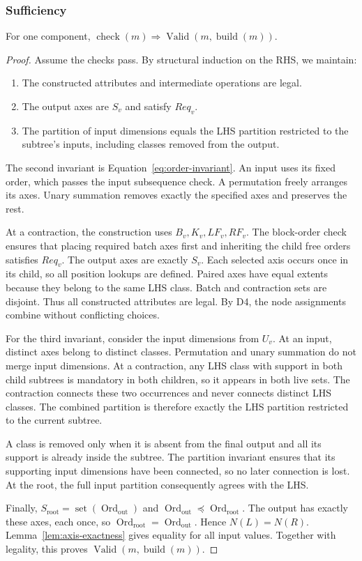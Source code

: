 \subsubsection{Sufficiency}
\begin{lemma}[Sufficiency]
\label{lem:sufficiency}
For one component,
$\operatorname{check}(m)\Rightarrow
\operatorname{Valid}(m,\operatorname{build}(m))$.
\end{lemma}
\begin{proof}
Assume the checks pass. By structural induction on the RHS, we maintain:
\begin{enumerate}
\item The constructed attributes and intermediate operations are legal.
\item The output axes are $S_v$ and satisfy $Req_v$.
\item The partition of input dimensions equals the LHS partition restricted to
the subtree's inputs, including classes removed from the output.
\end{enumerate}
The second invariant is Equation~\eqref{eq:order-invariant}.
An input uses its fixed order, which passes the input subsequence check.
A permutation freely arranges its axes. Unary summation removes exactly
the specified axes and preserves the rest.

At a contraction, the construction uses $B_v,K_v,LF_v,RF_v$.
The block-order check ensures that placing required batch axes first and
inheriting the child free orders satisfies $Req_v$. The output axes are
exactly $S_v$. Each selected axis occurs once in its child, so all position
lookups are defined. Paired axes have equal extents because they belong to
the same LHS class. Batch and contraction sets are disjoint. Thus all
constructed attributes are legal.
By D4, the node assignments combine without conflicting choices.

For the third invariant, consider the input dimensions from $U_v$.
At an input, distinct axes belong to distinct classes. Permutation and
unary summation do not merge input dimensions. At a contraction, any LHS class with
support in both child subtrees is mandatory in both children, so it appears
in both live sets. The contraction connects these two occurrences and never
connects distinct LHS classes. The combined partition is therefore exactly
the LHS partition restricted to the current subtree.

A class is removed only when it is absent from the final output and all its
support is already inside the subtree. The partition invariant ensures that
its supporting input dimensions have been connected, so no later connection is lost.
At the root, the full input partition consequently agrees with the LHS.

Finally, $S_{\mathrm{root}}=\operatorname{set}(\operatorname{Ord}_{\mathrm{out}})$ and
$\operatorname{Ord}_{\mathrm{out}}\preceq\operatorname{Ord}_{\mathrm{root}}$. The output has exactly these
axes, each once, so $\operatorname{Ord}_{\mathrm{root}}=\operatorname{Ord}_{\mathrm{out}}$. Hence
$N(L)=N(R)$. Lemma~\ref{lem:axis-exactness} gives equality for all input
values. Together with legality, this proves
$\operatorname{Valid}(m,\operatorname{build}(m))$.
\end{proof}

